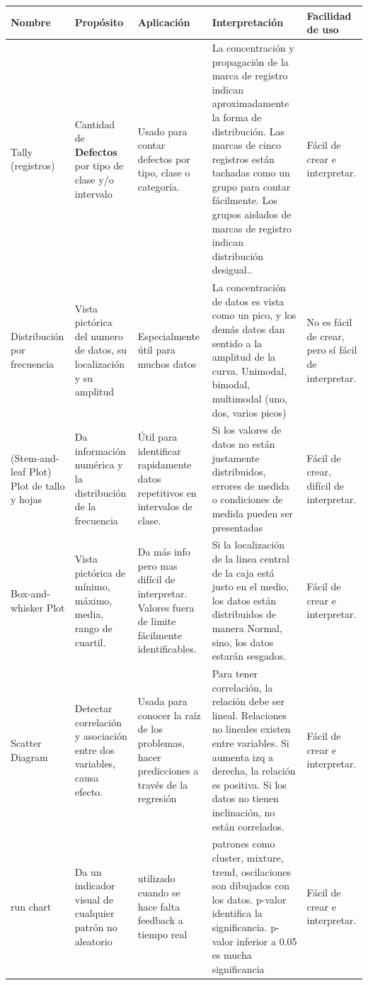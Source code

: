 \documentclass[]{article}
\begin{document}
\begin{tabular}{p{2cm}|p{2.5cm}|p{3cm}|p{5cm}|p{2.5cm}}
	\hline Nombre & Propósito & Aplicación & Interpretación & Facilidad de uso \\ 
	\hline Tally (registros) & Cantidad de \textbf{Defectos} por tipo de clase y/o intervalo & Usado para contar defectos por tipo, clase o categoría. & La concentración y propagación de la marca de registro indican aproximadamente la forma de distribución. Las marcas de cinco registros están tachadas como un grupo para contar fácilmente. Los grupos aislados de marcas de registro indican distribución desigual.. & Fácil de crear e interpretar.  \\ 
    \hline Distribución por frecuencia & Vista pictórica del numero de datos, su localización y su amplitud & Especialmente útil para muchos datos & La concentración de datos es vista como un pico, y los demás datos dan sentido a la amplitud de la curva. Unimodal, bimodal, multimodal (uno, dos, varios picos) & No es fácil de crear, pero sí fácil de interpretar. \\
    \hline (Stem-and-leaf Plot) Plot de tallo y hojas & Da información numérica y la distribución de la frecuencia & Útil para identificar rapidamente datos repetitivos en intervalos de clase. & Si los valores de datos no están justamente distribuidos, errores de medida o condiciones de medida pueden ser presentadas & Fácil de crear, difícil de interpretar. \\
    \hline Box-and-whisker Plot & Vista pictórica de mínimo, máximo, media, rango de cuartil. & Da más info pero mas difícil de interpretar. Valores fuera de limite fácilmente identificables. & Si la localización de la linea central de la caja está justo en el medio, los datos están distribuidos de manera Normal, sino, los datos estarán sesgados.  &  Fácil de crear e interpretar. \\
    \hline Scatter Diagram & Detectar correlación y asociación entre dos variables, causa efecto. & Usada para conocer la raíz de los problemas, hacer predicciones a través de la regresión & Para tener correlación, la relación debe ser lineal. Relaciones no lineales existen entre variables. Si aumenta izq a derecha, la relación es positiva. Si los datos no tienen inclinación, no están correlados. & Fácil de crear e interpretar. \\
    \hline run chart & Da un indicador visual de cualquier patrón no aleatorio & utilizado cuando se hace falta feedback a tiempo real & patrones como cluster, mixture, trend, oscilaciones son dibujados con los datos. p-valor identifica la significancia. p-valor inferior a 0.05 es mucha significancia & Fácil de crear e interpretar. \\
	\hline 
\end{tabular} 
\end{document}
